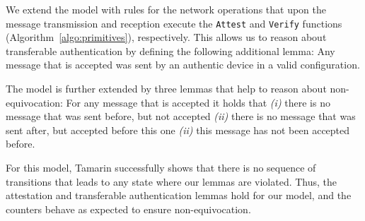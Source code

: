 We extend the model with rules for the network operations that upon the message transmission and reception execute the {\tt Attest} and {\tt Verify} functions (Algorithm~\ref{algo:primitives}), respectively. This allows us to reason about transferable authentication by defining the following additional lemma: Any message that is accepted was sent by an authentic \projecttitle{} device in a valid configuration.




 The model is further extended by three lemmas that help to reason about non-equivocation: For any message that is accepted it holds that \emph{(i)} there is no message that was sent before, but not accepted \emph{(ii)} there is no message that was sent after, but accepted before this one \emph{(ii)} this message has not been accepted before.

For this model, Tamarin successfully shows that there is no sequence of transitions that leads to any state where our lemmas are violated. Thus, the attestation and transferable authentication lemmas hold for our model, and the counters behave as expected to ensure non-equivocation.